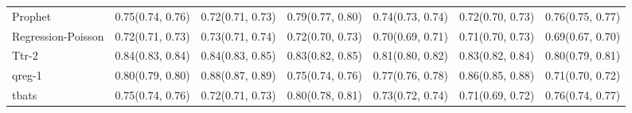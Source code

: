 \begin{tabularx}{\textwidth}{X p{} p{} p{} p{} p{} p{}}
Prophet & {0.75\newline(0.74, 0.76)} & {0.72\newline(0.71, 0.73)} & {0.79\newline(0.77, 0.80)} & {0.74\newline(0.73, 0.74)} & {0.72\newline(0.70, 0.73)} & {0.76\newline(0.75, 0.77)} \\
Regression-Poisson & {0.72\newline(0.71, 0.73)} & {0.73\newline(0.71, 0.74)} & {0.72\newline(0.70, 0.73)} & {0.70\newline(0.69, 0.71)} & {0.71\newline(0.70, 0.73)} & {0.69\newline(0.67, 0.70)} \\
Ttr-2 & {0.84\newline(0.83, 0.84)} & {0.84\newline(0.83, 0.85)} & {0.83\newline(0.82, 0.85)} & {0.81\newline(0.80, 0.82)} & {0.83\newline(0.82, 0.84)} & {0.80\newline(0.79, 0.81)} \\
qreg-1 & {0.80\newline(0.79, 0.80)} & {0.88\newline(0.87, 0.89)} & {0.75\newline(0.74, 0.76)} & {0.77\newline(0.76, 0.78)} & {0.86\newline(0.85, 0.88)} & {0.71\newline(0.70, 0.72)} \\
tbats & {0.75\newline(0.74, 0.76)} & {0.72\newline(0.71, 0.73)} & {0.80\newline(0.78, 0.81)} & {0.73\newline(0.72, 0.74)} & {0.71\newline(0.69, 0.72)} & {0.76\newline(0.74, 0.77)} \\
\bottomrule
\end{tabularx}

